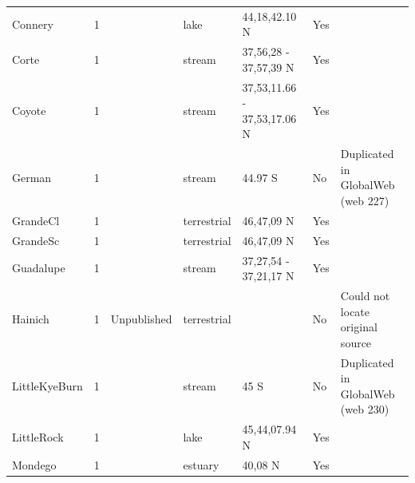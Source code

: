 \documentclass[12pt]{article}
\begin{document}
\begin{landscape}
\begin{table}[h!]
{\begin{tabular}{p{2.8cm}p{1.3cm}p{5.5cm}p{2.2cm}p{2.5cm}lp{3.5cm}}
        Connery & 1 & \cite{Havens1992}    & lake  & 44,18,42.10 N & Yes   &       \\
        Corte & 1 & \cite{Harrison1995}    & stream & 37,56,28 - 37,57,39 N & Yes   &       \\
        Coyote & 1 & \cite{Harrison1995}    & stream & 37,53,11.66 - 37,53,17.06 N & Yes   &       \\
        German & 1 & \cite{Townsend1998}  & stream & 44.97 S & No    & Duplicated in GlobalWeb (web 227) \\
        GrandeCl & 1 & \cite{CattinBlandenier2004} & terrestrial & 46,47,09 N & Yes   &       \\
        GrandeSc & 1 & \cite{CattinBlandenier2004} & terrestrial & 46,47,09 N & Yes   &       \\
        Guadalupe & 1 & \cite{Harrison1995}    & stream & 37,27,54 - 37,21,17 N & Yes   &       \\
        Hainich   & 1 & Unpublished  & terrestrial &       & No    & Could not locate original source \\
        LittleKyeBurn & 1 & \cite{Townsend1998}  & stream & 45 S  & No    & Duplicated in GlobalWeb (web 230) \\
        LittleRock & 1 & \cite{Martinez1991}    & lake  & 45,44,07.94 N & Yes   &       \\
        Mondego & 1 & \cite{Patricio2006}  & estuary & 40,08 N & Yes   &       \\
        \hline
      \end{tabular}}%
      \end{table}

        \newpage


\end{landscape}
\end{document}
